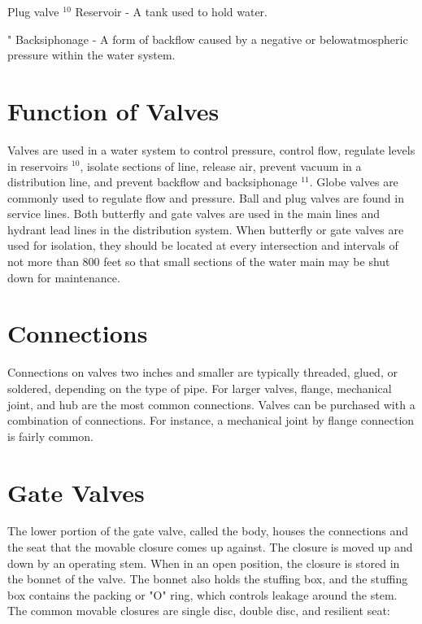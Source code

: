 \documentclass[10pt]{article}
\begin{document}
Plug valve ${ }^{10}$ Reservoir - A tank used to hold water.

" Backsiphonage - A form of backflow caused by a negative or belowatmospheric pressure within the water system.

\section{Function of Valves}
Valves are used in a water system to control pressure, control flow, regulate levels in reservoirs $^{10}$, isolate sections of line, release air, prevent vacuum in a distribution line, and prevent backflow and backsiphonage ${ }^{11}$. Globe valves are commonly used to regulate flow and pressure. Ball and plug valves are found in service lines. Both butterfly and gate valves are used in the main lines and hydrant lead lines in the distribution system. When butterfly or gate valves are used for isolation, they should be located at every intersection and intervals of not more than 800 feet so that small sections of the water main may be shut down for maintenance.

\section{Connections}
Connections on valves two inches and smaller are typically threaded, glued, or soldered, depending on the type of pipe. For larger valves, flange, mechanical joint, and hub are the most common connections. Valves can be purchased with a combination of connections. For instance, a mechanical joint by flange connection is fairly common.

\section{Gate Valves}
The lower portion of the gate valve, called the body, houses the connections and the seat that the movable closure comes up against. The closure is moved up and down by an operating stem. When in an open position, the closure is stored in the bonnet of the valve. The bonnet also holds the stuffing box, and the stuffing box contains the packing or "O" ring, which controls leakage around the stem. The common movable closures are single disc, double disc, and resilient seat:
\end{document}
